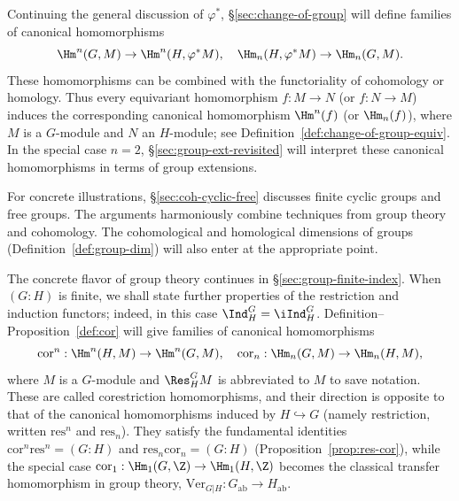 Continuing the general discussion of $\varphi^*$,
\S\ref{sec:change-of-group} will define families of canonical homomorphisms
\[ \Hm^n(G, M) \to \Hm^n(H, \varphi^* M), \quad \Hm_n(H, \varphi^* M) \to \Hm_n(G, M). \]
These homomorphisms can be combined with the functoriality of cohomology or
homology. Thus every equivariant homomorphism $f:M\to N$ (or $f:N\to M$)
induces the corresponding canonical homomorphism $\Hm^n(f)$ (or $\Hm_n(f)$),
where $M$ is a $G$-module and $N$ an $H$-module; see
Definition~\ref{def:change-of-group-equiv}. In the special case $n=2$,
\S\ref{sec:group-ext-revisited} will interpret these canonical homomorphisms
in terms of group extensions.

For concrete illustrations, \S\ref{sec:coh-cyclic-free} discusses finite
cyclic groups and free groups. The arguments harmoniously combine techniques
from group theory and cohomology. The cohomological and homological dimensions
of groups (Definition~\ref{def:group-dim}) will also enter at the appropriate
point.

The concrete flavor of group theory continues in
\S\ref{sec:group-finite-index}. When $(G:H)$ is finite, we shall state further
properties of the restriction and induction functors; indeed, in this case
$\Ind^G_H=\iInd^G_H$. Definition--Proposition~\ref{def:cor} will give
families of canonical homomorphisms
\[ \mathrm{cor}^n: \Hm^n(H, M) \to \Hm^n(G, M), \quad \mathrm{cor}_n: \Hm_n(G, M) \to \Hm_n(H, M), \]
where $M$ is a $G$-module and $\Res^G_HM$ is abbreviated to $M$ to save
notation. These are called corestriction homomorphisms, and their direction is
opposite to that of the canonical homomorphisms induced by $H\hookrightarrow
G$ (namely restriction, written $\mathrm{res}^n$ and $\mathrm{res}_n$). They
satisfy the fundamental identities
$\mathrm{cor}^n\mathrm{res}^n=(G:H)$ and
$\mathrm{res}_n\mathrm{cor}_n=(G:H)$
(Proposition~\ref{prop:res-cor}), while the special case
$\mathrm{cor}_1:\Hm_1(G,\Z)\to\Hm_1(H,\Z)$ becomes the classical transfer
homomorphism in group theory,
$\mathrm{Ver}_{G|H}:G_{\mathrm{ab}}\to H_{\mathrm{ab}}$.

